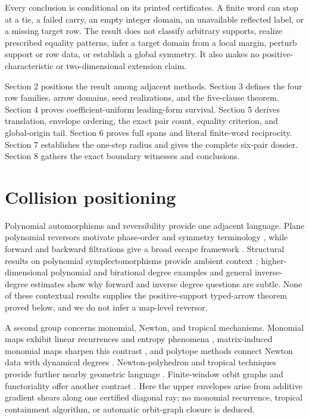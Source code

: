 \documentclass[11pt]{article}
\theoremstyle{definition}
\theoremstyle{remark}
\begin{document}
Every conclusion is conditional on its printed certificates.  A finite
word can stop at a tie, a failed carry, an empty integer domain, an
unavailable reflected label, or a missing target row.  The result does not
classify arbitrary supports, realize prescribed equality patterns, infer a
target domain from a local margin, perturb support or row data, or establish
a global symmetry.  It also makes no positive-characteristic or
two-dimensional extension claim.

Section 2 positions the result among adjacent methods.  Section 3 defines
the four row families, arrow domains, seed realizations, and the
five-clause theorem.  Section 4 proves coefficient-uniform leading-form
survival.  Section 5 derives translation, envelope ordering, the exact
pair count, equality criterion, and global-origin tail.  Section 6 proves
full spans and literal finite-word reciprocity.  Section 7 establishes the
one-step radius and gives the complete six-pair dossier.  Section 8 gathers
the exact boundary witnesses and conclusions.

\section{Collision positioning}

Polynomial automorphisms and reversibility provide one adjacent language.
Plane polynomial reversors motivate phase-order and symmetry terminology
\cite{gomez_meiss_2004}, while forward and backward filtrations give a
broad escape framework \cite{shafikov_wolf_2003}.  Structural results on
polynomial symplectomorphisms provide ambient context
\cite{janeczko_jelonek_2008}; higher-dimensional polynomial and birational
degree examples \cite{deserti_2018} and general inverse-degree estimates
\cite{cheng_wang_yu_1994} show why forward and inverse degree questions are
subtle.  None of these contextual results supplies the positive-support
typed-arrow theorem proved below, and we do not infer a map-level reversor.

A second group concerns monomial, Newton, and tropical mechanisms.
Monomial maps exhibit linear recurrences and entropy phenomena
\cite{hasselblatt_propp_2007}, matrix-induced monomial maps sharpen this
contrast \cite{bedford_kim_2008}, and polytope methods connect Newton data
with dynamical degrees \cite{favre_wulcan_2012}.  Newton-polyhedron and
tropical techniques provide further nearby geometric language
\cite{el_hilany_2024,grigoriev_containment,nisse_2026}.  Finite-window
orbit graphs and functoriality offer another contrast
\cite{takenawa_2026}.  Here the upper envelopes arise from additive
gradient shears along one certified diagonal ray; no monomial recurrence,
tropical containment algorithm, or automatic orbit-graph closure is
deduced.
\end{document}
